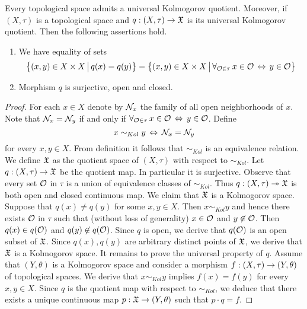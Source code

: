 \begin{theorem}\label{theorem:universal_Kolomogorov_quotient}
Every topological space admits a universal Kolmogorov quotient. Moreover, if $(X,\tau)$ is a topological space and $q:\left(X,\tau\right) \rightarrow {\mathfrak X}$ is its universal Kolmogorov quotient. Then the following assertions hold.
\begin{enumerate}[label=\emph{\textbf{(\arabic*)}}, leftmargin=*]
\item We have equality of sets
$$\big\{(x,y)\in X\times X\,\big|\,q(x) = q(y)\big\} = \big\{(x,y) \in X\times X\,\big|\,\forall_{{\mathcal O}\in \tau}\,x\in {\mathcal O}\,\Leftrightarrow\,y\in {\mathcal O}\big\}$$
\item Morphism $q$ is surjective, open and closed.
\end{enumerate}
\end{theorem}
\begin{proof}
For each $x \in X$ denote by ${\mathcal N}_x$ the family of all open neighborhoods of $x$. Note that ${\mathcal N}_x = {\mathcal N}_y$ if and only if $\forall_{{\mathcal O}\in \tau}\,x\in {\mathcal O}\,\Leftrightarrow\,y\in {\mathcal O}$. Define
$$x \sim_{Kol} y\,\Leftrightarrow\,{\mathcal N}_x = {\mathcal N}_y$$
for every $x,y\in X$. From definition it follows that $\sim_{Kol}$ is an equivalence relation. We define ${\mathfrak X}$ as the quotient space of $\left(X,\tau\right)$ with respect to $\sim_{Kol}$. Let $q:\left(X,\tau\right)\rightarrow {\mathfrak X}$ be the quotient map. In particular it is surjective. Observe that every set ${\mathcal O}$ in $\tau$ is a union of equivalence classes of $\sim_{Kol}$. Thus $q:\left(X,\tau\right)\twoheadrightarrow {\mathfrak X}$ is both open and closed continuous map. We claim that ${\mathfrak X}$ is a Kolmogorov space. Suppose that $q(x) \neq q(y)$ for some $x,y\in X$. Then $x \sim_{Kol} y$ and hence there exists ${\mathcal O}$ in $\tau$ such that (without loss of generality) $x \in {\mathcal O}$ and $y \not \in {\mathcal O}$. Then $q(x) \in q({\mathcal O})$ and $q(y) \not \in q({\mathcal O})$. Since $q$ is open, we derive that $q({\mathcal O})$ is an open subset of ${\mathfrak X}$. Since $q(x),q(y)$ are arbitrary distinct points of ${\mathfrak X}$, we derive that ${\mathfrak X}$ is a Kolmogorov space. It remains to prove the universal property of $q$. Assume that $\left(Y,\theta\right)$ is a Kolmogorov space and consider a morphism $f:\left(X,\tau\right)\rightarrow \left(Y,\theta\right)$ of topological spaces. We derive that $x \sim_{Kol} y$ implies $f(x) = f(y)$ for every $x,y\in X$. Since $q$ is the quotient map with respect to $\sim_{Kol}$, we deduce that there exists a unique continuous map $p:{\mathfrak X} \rightarrow \left(Y,\theta\right)$ such that $p\cdot q = f$.
\end{proof}

